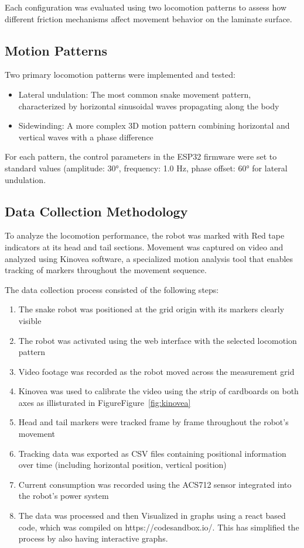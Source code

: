 \documentclass[12pt,a4paper]{report}
\begin{document}
Each configuration was evaluated using two locomotion patterns to assess how different friction mechanisms affect movement behavior on the laminate surface.

\subsection{Motion Patterns}
Two primary locomotion patterns were implemented and tested:
\begin{itemize}
    \item Lateral undulation: The most common snake movement pattern, characterized by horizontal sinusoidal waves propagating along the body
    \item Sidewinding: A more complex 3D motion pattern combining horizontal and vertical waves with a phase difference
\end{itemize}

For each pattern, the control parameters in the ESP32 firmware were set to standard values (amplitude: 30°, frequency: 1.0 Hz, phase offset: 60° for lateral undulation.

\subsection{Data Collection Methodology}
To analyze the locomotion performance, the robot was marked with Red tape indicators at its head and tail sections. Movement was captured on video and analyzed using Kinovea software, a specialized motion analysis tool that enables tracking of markers throughout the movement sequence.

The data collection process consisted of the following steps:
\begin{enumerate}
    \item The snake robot was positioned at the grid origin with its markers clearly visible
    \item The robot was activated using the web interface with the selected locomotion pattern
    \item Video footage was recorded as the robot moved across the measurement grid
    \item Kinovea was used to calibrate the video using the strip of cardboards on both axes as illisturated in FigureFigure~\ref{fig:kinovea}
    \item Head and tail markers were tracked frame by frame throughout the robot's movement
    \item Tracking data was exported as CSV files containing positional information over time (including horizontal position, vertical position)
    \item Current consumption was recorded using the ACS712 sensor integrated into the robot's power system
    \item The data was processed and then Visualized in graphs using a react based code, which was compiled on https://codesandbox.io/. This has simplified the process by also having interactive graphs.
\end{enumerate}
\end{document}
